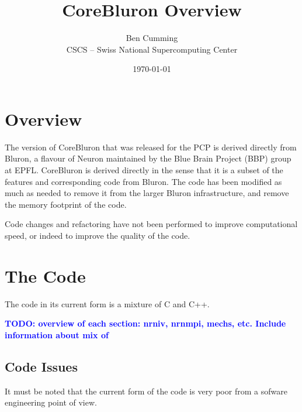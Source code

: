 \documentclass[11pt,a4paper]{article}
\newcommand{\todo}[1]{\textbf{\textcolor{blue}{TODO: #1}}} %
\begin{document}
\title{CoreBluron Overview}
\author{Ben Cumming\\CSCS -- Swiss National Supercomputing Center}
\date{\today}
\maketitle


\section{Overview}
The version of CoreBluron that was released for the PCP is derived directly from Bluron, a flavour of Neuron maintained by the Blue Brain Project (BBP) group at EPFL. CoreBluron is derived directly in the sense that it is a subset of the features and corresponding code from Bluron. The code has been modified as much as needed to remove it from the larger Bluron infrastructure, and remove the memory footprint of the code.

Code changes and refactoring have not been performed to improve computational speed, or indeed to improve the quality of the code.

\section{The Code}
The code in its current form is a mixture of C and C++.

\todo{overview of each section: nrniv, nrnmpi, mechs, etc. Include information about mix of }

\subsection{Code Issues}
It must be noted that the current form of the code is very poor from a sofware engineering point of view.
\end{document}
